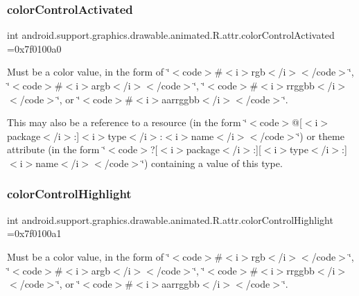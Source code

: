 \subsubsection{\texorpdfstring{color\+Control\+Activated}{colorControlActivated}}
{\footnotesize\ttfamily int android.\+support.\+graphics.\+drawable.\+animated.\+R.\+attr.\+color\+Control\+Activated =0x7f0100a0\hspace{0.3cm}{\ttfamily [static]}}

Must be a color value, in the form of \char`\"{}$<$code$>$\#$<$i$>$rgb$<$/i$>$$<$/code$>$\char`\"{}, \char`\"{}$<$code$>$\#$<$i$>$argb$<$/i$>$$<$/code$>$\char`\"{}, \char`\"{}$<$code$>$\#$<$i$>$rrggbb$<$/i$>$$<$/code$>$\char`\"{}, or \char`\"{}$<$code$>$\#$<$i$>$aarrggbb$<$/i$>$$<$/code$>$\char`\"{}. 

This may also be a reference to a resource (in the form \char`\"{}$<$code$>$@\mbox{[}$<$i$>$package$<$/i$>$\+:\mbox{]}$<$i$>$type$<$/i$>$\+:$<$i$>$name$<$/i$>$$<$/code$>$\char`\"{}) or theme attribute (in the form \char`\"{}$<$code$>$?\mbox{[}$<$i$>$package$<$/i$>$\+:\mbox{]}\mbox{[}$<$i$>$type$<$/i$>$\+:\mbox{]}$<$i$>$name$<$/i$>$$<$/code$>$\char`\"{}) containing a value of this type. \mbox{\label{classandroid_1_1support_1_1graphics_1_1drawable_1_1animated_1_1R_1_1attr_ae63729e68c4c788cacdc5d30097aa26a}} 
\subsubsection{\texorpdfstring{color\+Control\+Highlight}{colorControlHighlight}}
{\footnotesize\ttfamily int android.\+support.\+graphics.\+drawable.\+animated.\+R.\+attr.\+color\+Control\+Highlight =0x7f0100a1\hspace{0.3cm}{\ttfamily [static]}}

Must be a color value, in the form of \char`\"{}$<$code$>$\#$<$i$>$rgb$<$/i$>$$<$/code$>$\char`\"{}, \char`\"{}$<$code$>$\#$<$i$>$argb$<$/i$>$$<$/code$>$\char`\"{}, \char`\"{}$<$code$>$\#$<$i$>$rrggbb$<$/i$>$$<$/code$>$\char`\"{}, or \char`\"{}$<$code$>$\#$<$i$>$aarrggbb$<$/i$>$$<$/code$>$\char`\"{}. 

